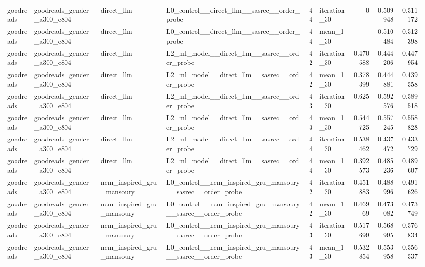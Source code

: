 \begin{table}[htbp!]
\begin{tabular}{llllrlrrr}
goodreads & goodreads\_gender\_a300\_e804 & direct\_llm & L0\_control\_\_direct\_llm\_\_sasrec\_\_order\_probe & 44 & iteration\_30 & 0 & 0.509948 & 0.511172 \\
goodreads & goodreads\_gender\_a300\_e804 & direct\_llm & L0\_control\_\_direct\_llm\_\_sasrec\_\_order\_probe & 44 & mean\_1\_30 & \textemdash{} & 0.510484 & 0.512398 \\
goodreads & goodreads\_gender\_a300\_e804 & direct\_llm & L2\_ml\_model\_\_direct\_llm\_\_sasrec\_\_order\_probe & 42 & iteration\_30 & 0.470588 & 0.444206 & 0.447954 \\
goodreads & goodreads\_gender\_a300\_e804 & direct\_llm & L2\_ml\_model\_\_direct\_llm\_\_sasrec\_\_order\_probe & 42 & mean\_1\_30 & 0.378399 & 0.444881 & 0.439558 \\
goodreads & goodreads\_gender\_a300\_e804 & direct\_llm & L2\_ml\_model\_\_direct\_llm\_\_sasrec\_\_order\_probe & 43 & iteration\_30 & 0.625 & 0.592576 & 0.589518 \\
goodreads & goodreads\_gender\_a300\_e804 & direct\_llm & L2\_ml\_model\_\_direct\_llm\_\_sasrec\_\_order\_probe & 43 & mean\_1\_30 & 0.544725 & 0.557245 & 0.558828 \\
goodreads & goodreads\_gender\_a300\_e804 & direct\_llm & L2\_ml\_model\_\_direct\_llm\_\_sasrec\_\_order\_probe & 44 & iteration\_30 & 0.538462 & 0.437472 & 0.433729 \\
goodreads & goodreads\_gender\_a300\_e804 & direct\_llm & L2\_ml\_model\_\_direct\_llm\_\_sasrec\_\_order\_probe & 44 & mean\_1\_30 & 0.392573 & 0.485236 & 0.489607 \\
goodreads & goodreads\_gender\_a300\_e804 & ncm\_inspired\_gru\_mansoury & L0\_control\_\_ncm\_inspired\_gru\_mansoury\_\_sasrec\_\_order\_probe & 42 & iteration\_30 & 0.451883 & 0.488996 & 0.491626 \\
goodreads & goodreads\_gender\_a300\_e804 & ncm\_inspired\_gru\_mansoury & L0\_control\_\_ncm\_inspired\_gru\_mansoury\_\_sasrec\_\_order\_probe & 42 & mean\_1\_30 & 0.46969 & 0.473082 & 0.473749 \\
goodreads & goodreads\_gender\_a300\_e804 & ncm\_inspired\_gru\_mansoury & L0\_control\_\_ncm\_inspired\_gru\_mansoury\_\_sasrec\_\_order\_probe & 43 & iteration\_30 & 0.517699 & 0.568995 & 0.576834 \\
goodreads & goodreads\_gender\_a300\_e804 & ncm\_inspired\_gru\_mansoury & L0\_control\_\_ncm\_inspired\_gru\_mansoury\_\_sasrec\_\_order\_probe & 43 & mean\_1\_30 & 0.532854 & 0.553958 & 0.556537 \\

\end{tabular}
\end{table}
